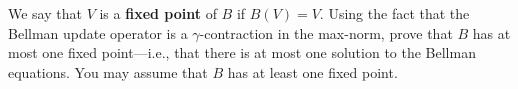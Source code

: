\item {} We say that $V$ is a {\bf fixed point} of $B$ if
$B(V) = V$. Using the fact that the Bellman update operator is a
$\gamma$-contraction in the max-norm, prove that $B$ has at most
one fixed point---i.e., that there is at most one solution to the
Bellman equations.  You may assume that $B$ has at least one fixed
point.

